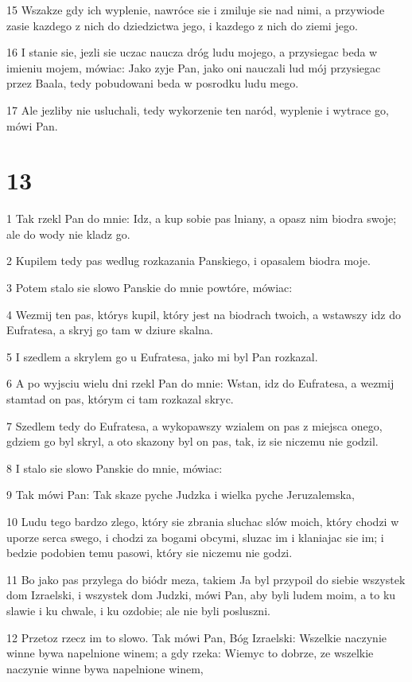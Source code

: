 \par 15 Wszakze gdy ich wyplenie, nawróce sie i zmiluje sie nad nimi, a przywiode zasie kazdego z nich do dziedzictwa jego, i kazdego z nich do ziemi jego.
\par 16 I stanie sie, jezli sie uczac naucza dróg ludu mojego, a przysiegac beda w imieniu mojem, mówiac: Jako zyje Pan, jako oni nauczali lud mój przysiegac przez Baala, tedy pobudowani beda w posrodku ludu mego.
\par 17 Ale jezliby nie usluchali, tedy wykorzenie ten naród, wyplenie i wytrace go, mówi Pan.

\chapter{13}

\par 1 Tak rzekl Pan do mnie: Idz, a kup sobie pas lniany, a opasz nim biodra swoje; ale do wody nie kladz go.
\par 2 Kupilem tedy pas wedlug rozkazania Panskiego, i opasalem biodra moje.
\par 3 Potem stalo sie slowo Panskie do mnie powtóre, mówiac:
\par 4 Wezmij ten pas, którys kupil, który jest na biodrach twoich, a wstawszy idz do Eufratesa, a skryj go tam w dziure skalna.
\par 5 I szedlem a skrylem go u Eufratesa, jako mi byl Pan rozkazal.
\par 6 A po wyjsciu wielu dni rzekl Pan do mnie: Wstan, idz do Eufratesa, a wezmij stamtad on pas, którym ci tam rozkazal skryc.
\par 7 Szedlem tedy do Eufratesa, a wykopawszy wzialem on pas z miejsca onego, gdziem go byl skryl, a oto skazony byl on pas, tak, iz sie niczemu nie godzil.
\par 8 I stalo sie slowo Panskie do mnie, mówiac:
\par 9 Tak mówi Pan: Tak skaze pyche Judzka i wielka pyche Jeruzalemska,
\par 10 Ludu tego bardzo zlego, który sie zbrania sluchac slów moich, który chodzi w uporze serca swego, i chodzi za bogami obcymi, sluzac im i klaniajac sie im; i bedzie podobien temu pasowi, który sie niczemu nie godzi.
\par 11 Bo jako pas przylega do biódr meza, takiem Ja byl przypoil do siebie wszystek dom Izraelski, i wszystek dom Judzki, mówi Pan, aby byli ludem moim, a to ku slawie i ku chwale, i ku ozdobie; ale nie byli posluszni.
\par 12 Przetoz rzecz im to slowo. Tak mówi Pan, Bóg Izraelski: Wszelkie naczynie winne bywa napelnione winem; a gdy rzeka: Wiemyc to dobrze, ze wszelkie naczynie winne bywa napelnione winem,
